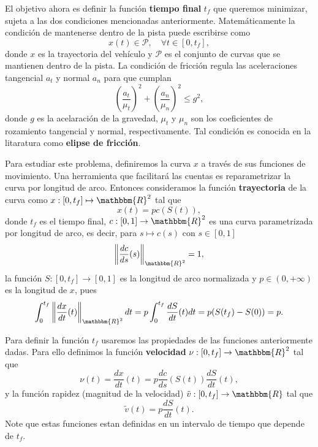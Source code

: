 \documentclass[a4paper,10pt]{book}
\newcommand{\R}{\mathbbm{R}}
\newcommand{\arr}{\rightarrow}
\begin{document}
El objetivo ahora es definir la función \textbf{tiempo final} $t_f$ que queremos minimizar, sujeta a las dos condiciones mencionadas anteriormente. Matem\'aticamente la condici\'on de mantenerse dentro de la pista puede escribirse como
\[
x(t)\in \mathcal{P}, \quad\forall t\in[0,t_f],
\]
donde $x$ es la trayectoria del vehículo y $\mathcal{P}$ es el conjunto de curvas que se mantienen dentro de la pista. La condici\'on de fricción regula las aceleraciones tangencial $a_t$ y normal $a_n$ para que cumplan
\begin{equation}\label{elipse}
 \left(\frac{a_t}{\mu_t}\right)^2+ \left(\frac{a_n}{\mu_n}\right)^2\leq g^2, 
\end{equation}
donde $g$ es la acelaración de la gravedad, $\mu_t$ y $\mu_n$ son los coeficientes de rozamiento tangencial y normal, respectivamente. Tal condici\'on es conocida en la litaratura como \textbf{elipse de fricción}.

Para estudiar este problema, definiremos la curva $x$ a través de sus funciones de movimiento. Una herramienta que facilitará las cuentas es reparametrizar la curva por longitud de arco.
Entonces consideramos la función \textbf{trayectoria} de la curva como $x:[0,t_f]\mapsto \R^2$ tal que
\begin{equation}\label{trayectoria}
x(t) = p c(S(t)), 
\end{equation}
donde \(t_f\) es el tiempo final, $c:[0,1]\arr\R^2$ es una curva parametrizada por longitud de arco, es decir, para $s\mapsto c(s)$ con $s\in[0,1]$
\begin{equation}\label{pla}
\left \|\frac{dc}{ds}(s)\right\|_{\R^2}=1,    
\end{equation}
la funci\'on $S:[0,t_f]\arr [0,1]$ es la longitud de arco normalizada y $p\in(0,+\infty)$ es la longitud de $x$, pues
\[
 \int_0^{t_f} \left\|\frac{dx}{dt}(t)\right\|_{\R^2} dt = p \int_0^{t_f} \frac{dS}{dt}(t)dt=p(S(t_f)-S(0))=p.
\]


Para definir la funci\'on $t_f$ usaremos las propiedades de las funciones anteriormente dadas. Para ello definimos la función \textbf{velocidad} $\nu:[0,t_f]\arr\R^2$ tal que
\begin{equation}
  \nu(t)=\frac{dx}{dt}(t)=p\frac{dc}{ds}(S(t))\frac{dS}{dt}(t), \label{velocidad}
\end{equation}
y la funci\'on rapidez (magnitud de la velocidad) $\tilde{v}:[0,t_f]\arr\R$ tal que
\[
 \tilde{v}(t)=p\frac{dS}{dt}(t).
\]
Note que estas funciones estan definidas en un intervalo de tiempo que depende de $t_f$.
\end{document}
